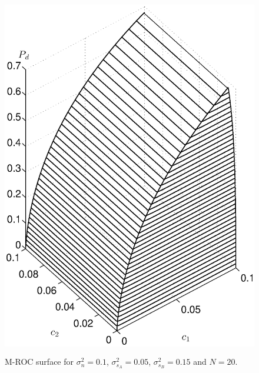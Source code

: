 \begin{figure}[!t]
\centering
\includegraphics[width=12cm, height=16cm]{4/energy.eps}
\caption{M-ROC surface for $\sigma_n^2 = 0.1$, $\sigma_{s_A}^2=0.05$, $\sigma_{s_B}^2=0.15$ and $N = 20$.}
\label{pic:1201a1}
\end{figure}

